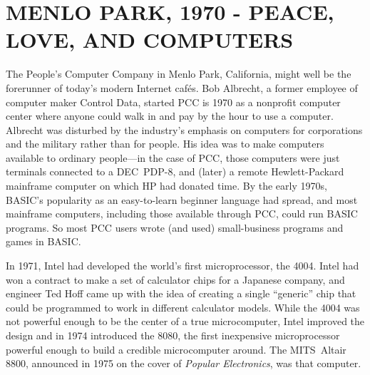 
\section{MENLO PARK, 1970 - PEACE, LOVE, AND COMPUTERS}



The People's Computer Company in Menlo Park, California, 
might well be the forerunner of today's
modern Internet caf\'{e}s.
Bob Albrecht, a former employee of computer maker Control Data, started PCC
is 1970
as a nonprofit computer center where anyone could walk in and pay
by the hour to use a computer.
Albrecht was disturbed by
the industry's emphasis on computers for corporations and
the military rather than for people.
His idea was to make computers available to ordinary people---in the
case of PCC, those computers were just
terminals connected to a DEC~PDP-8, and (later)
a remote Hewlett-Packard
mainframe computer on which HP had donated time.
By the early 1970s, BASIC's popularity as an easy-to-learn beginner
language had spread, 
and most mainframe computers, including those available through PCC, 
could run BASIC programs.
So most PCC users wrote (and used) small-business programs
and games in BASIC.


In 1971, Intel had developed the world's first microprocessor, the
4004.  Intel had won a contract to make a set of calculator chips for a
Japanese company, and engineer Ted Hoff came up with the idea of
creating a single ``generic'' chip that could be programmed to work in
different calculator models.  While the 4004 was not powerful enough to
be the center of a true microcomputer, Intel improved the design and in 
1974 introduced the 8080, the first inexpensive microprocessor powerful
enough to build a credible microcomputer around.  The MITS~Altair 8800,
announced in 1975 on the cover of \emph{Popular Electronics}, was
that computer.

